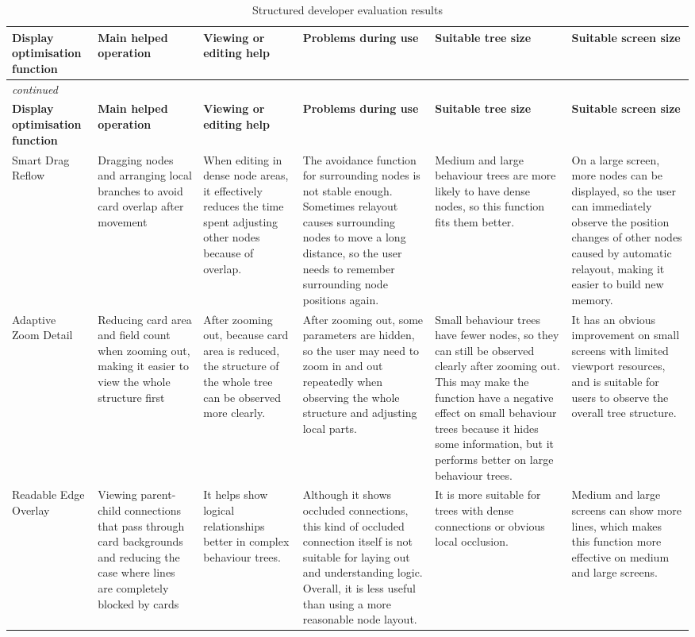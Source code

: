 \begin{center}
\begin{longtable}{@{}p{} p{} p{} p{} p{} p{}@{}}
\caption{Structured developer evaluation results}\label{tab:developer-evaluation}\\
\toprule
\textbf{Display optimisation function} & \textbf{Main helped operation} & \textbf{Viewing or editing help} & \textbf{Problems during use} & \textbf{Suitable tree size} & \textbf{Suitable screen size} \\
\midrule
\endfirsthead
\multicolumn{6}{l}{\itshape continued}\\
\toprule
\textbf{Display optimisation function} & \textbf{Main helped operation} & \textbf{Viewing or editing help} & \textbf{Problems during use} & \textbf{Suitable tree size} & \textbf{Suitable screen size} \\
\midrule
\endhead
Smart Drag Reflow & Dragging nodes and arranging local branches to avoid card overlap after movement & When editing in dense node areas, it effectively reduces the time spent adjusting other nodes because of overlap. & The avoidance function for surrounding nodes is not stable enough. Sometimes relayout causes surrounding nodes to move a long distance, so the user needs to remember surrounding node positions again. & Medium and large behaviour trees are more likely to have dense nodes, so this function fits them better. & On a large screen, more nodes can be displayed, so the user can immediately observe the position changes of other nodes caused by automatic relayout, making it easier to build new memory. \\
Adaptive Zoom Detail & Reducing card area and field count when zooming out, making it easier to view the whole structure first & After zooming out, because card area is reduced, the structure of the whole tree can be observed more clearly. & After zooming out, some parameters are hidden, so the user may need to zoom in and out repeatedly when observing the whole structure and adjusting local parts. & Small behaviour trees have fewer nodes, so they can still be observed clearly after zooming out. This may make the function have a negative effect on small behaviour trees because it hides some information, but it performs better on large behaviour trees. & It has an obvious improvement on small screens with limited viewport resources, and is suitable for users to observe the overall tree structure. \\
Readable Edge Overlay & Viewing parent-child connections that pass through card backgrounds and reducing the case where lines are completely blocked by cards & It helps show logical relationships better in complex behaviour trees. & Although it shows occluded connections, this kind of occluded connection itself is not suitable for laying out and understanding logic. Overall, it is less useful than using a more reasonable node layout. & It is more suitable for trees with dense connections or obvious local occlusion. & Medium and large screens can show more lines, which makes this function more effective on medium and large screens. \\

\end{longtable}
\end{center}
